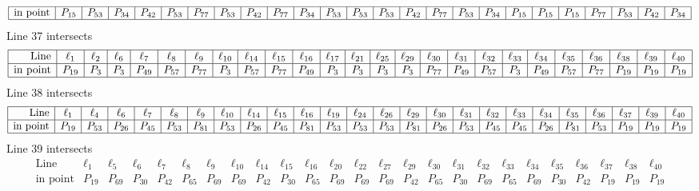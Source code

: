 \documentclass{article}
\begin{document}
{$$\begin{array}{|r*{24}{|c}|}
\hline
\mbox{in point}  & P_{15} & P_{53} & P_{34} & P_{42} & P_{53} & P_{77} & P_{53} & P_{42} & P_{77} & P_{34} & P_{53} & P_{53} & P_{53} & P_{42} & P_{77} & P_{53} & P_{34} & P_{15} & P_{15} & P_{15} & P_{77} & P_{53} & P_{42} & P_{34}\\
\hline
\end{array}
$$
Line 37 intersects 
$$
\begin{array}{|r*{24}{|c}|}
\hline
\mbox{Line}  & \ell_{1} & \ell_{2} & \ell_{6} & \ell_{7} & \ell_{8} & \ell_{9} & \ell_{10} & \ell_{14} & \ell_{15} & \ell_{16} & \ell_{17} & \ell_{21} & \ell_{25} & \ell_{29} & \ell_{30} & \ell_{31} & \ell_{32} & \ell_{33} & \ell_{34} & \ell_{35} & \ell_{36} & \ell_{38} & \ell_{39} & \ell_{40}\\
\hline
\mbox{in point}  & P_{19} & P_{3} & P_{3} & P_{49} & P_{57} & P_{77} & P_{3} & P_{57} & P_{77} & P_{49} & P_{3} & P_{3} & P_{3} & P_{3} & P_{77} & P_{49} & P_{57} & P_{3} & P_{49} & P_{57} & P_{77} & P_{19} & P_{19} & P_{19}\\
\hline
\end{array}
$$
Line 38 intersects 
$$
\begin{array}{|r*{24}{|c}|}
\hline
\mbox{Line}  & \ell_{1} & \ell_{4} & \ell_{6} & \ell_{7} & \ell_{8} & \ell_{9} & \ell_{10} & \ell_{14} & \ell_{15} & \ell_{16} & \ell_{19} & \ell_{24} & \ell_{26} & \ell_{29} & \ell_{30} & \ell_{31} & \ell_{32} & \ell_{33} & \ell_{34} & \ell_{35} & \ell_{36} & \ell_{37} & \ell_{39} & \ell_{40}\\
\hline
\mbox{in point}  & P_{19} & P_{53} & P_{26} & P_{45} & P_{53} & P_{81} & P_{53} & P_{26} & P_{45} & P_{81} & P_{53} & P_{53} & P_{53} & P_{81} & P_{26} & P_{53} & P_{45} & P_{45} & P_{26} & P_{81} & P_{53} & P_{19} & P_{19} & P_{19}\\
\hline
\end{array}
$$
Line 39 intersects 
$$
\begin{array}{|r*{24}{|c}|}
\hline
\mbox{Line}  & \ell_{1} & \ell_{5} & \ell_{6} & \ell_{7} & \ell_{8} & \ell_{9} & \ell_{10} & \ell_{14} & \ell_{15} & \ell_{16} & \ell_{20} & \ell_{22} & \ell_{27} & \ell_{29} & \ell_{30} & \ell_{31} & \ell_{32} & \ell_{33} & \ell_{34} & \ell_{35} & \ell_{36} & \ell_{37} & \ell_{38} & \ell_{40}\\
\hline
\mbox{in point}  & P_{19} & P_{69} & P_{30} & P_{42} & P_{65} & P_{69} & P_{69} & P_{42} & P_{30} & P_{65} & P_{69} & P_{69} & P_{69} & P_{42} & P_{65} & P_{30} & P_{69} & P_{65} & P_{69} & P_{30} & P_{42} & P_{19} & P_{19} & P_{19}\\

\end{array}$$}
\end{document}
